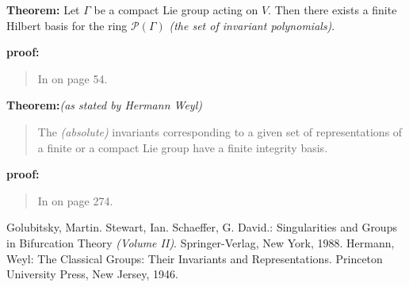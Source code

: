 \documentclass[12pt]{article}
\begin{document}
\textbf{Theorem:}
Let $\Gamma$ be a compact Lie group acting on $V$.  Then there exists a finite Hilbert basis for the ring $\mathcal{P}(\Gamma )$ \textit{(the set of invariant polynomials)}. \cite{1}

\textbf{proof:}
\begin{quote}
In \cite{1} on page 54.
\end{quote}
\textbf{Theorem:}\textit{(as stated by Hermann Weyl)}
\begin{quote}
The \textit{(absolute)} invariants corresponding to a given set of representations of a finite or a compact Lie group have a finite integrity basis.  \cite{2}
\end{quote}
\textbf{proof:}
\begin{quote}
In \cite{2} on page 274.
\end{quote}
\begin{thebibliography}{2}
 Golubitsky, Martin. Stewart, Ian. Schaeffer, G. David.: Singularities and Groups in Bifurcation Theory \textit{(Volume II)}. Springer-Verlag, New York, 1988.
 Hermann, Weyl: The Classical Groups: Their Invariants and Representations. Princeton University Press, New Jersey, 1946.
\end{thebibliography}
\end{document}
